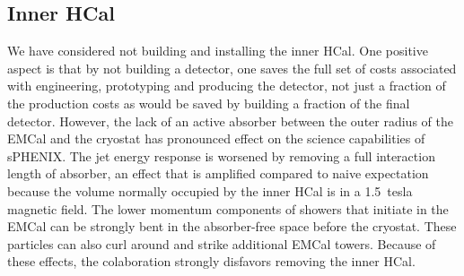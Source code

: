\subsection{Inner HCal}
\label{ihcal}

We have considered not building and installing the inner HCal.  One
positive aspect is that by not building a detector, one saves the full
set of costs associated with engineering, prototyping and producing
the detector, not just a fraction of the production costs as would be
saved by building a fraction of the final detector.  However, the lack
of an active absorber between the outer radius of the EMCal and the
cryostat has pronounced effect on the science capabilities of
sPHENIX. The jet energy response is worsened by removing a full
interaction length of absorber, an effect that is amplified compared
to naive expectation because the volume normally occupied by the inner
HCal is in a 1.5~tesla magnetic field.  The lower momentum components
of showers that initiate in the EMCal can be strongly bent in the
absorber-free space before the cryostat.  These particles can also
curl around and strike additional EMCal towers.  Because of these
effects, the colaboration strongly disfavors removing the inner HCal.

